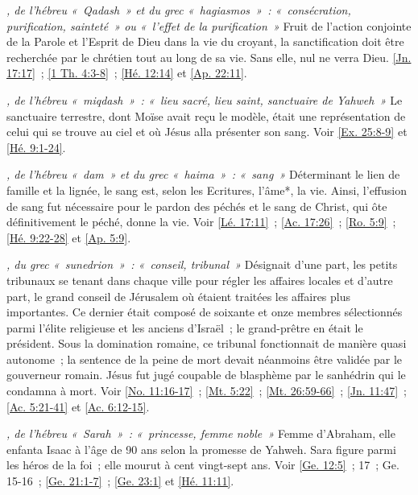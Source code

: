 \begin{multicols}{2}
\textit{, de l'hébreu «~Qadash~» et du grec «~hagiasmos~»~: «~consécration, purification, sainteté~» ou «~l'effet de la purification~»}\newline
Fruit de l'action conjointe de la Parole et l'Esprit de Dieu dans la vie du croyant, la sanctification doit être recherchée par le chrétien tout au long de sa vie. Sans elle, nul ne verra Dieu.\newline
\vref{Jn. 17:17}~; \vref{1 Th. 4:3-8}~; \vref{Hé. 12:14} et \vref{Ap. 22:11}.

\textit{, de l'hébreu «~miqdash~»~: «~lieu sacré, lieu saint, sanctuaire de Yahweh~»}\newline
Le sanctuaire terrestre, dont Moïse avait reçu le modèle, était une représentation de celui qui se trouve au ciel et où Jésus alla présenter son sang.\newline
Voir \vref{Ex. 25:8-9} et \vref{Hé. 9:1-24}.

\textit{, de l'hébreu «~dam~» et du grec «~haima~»~: «~sang~»}\newline
Déterminant le lien de famille et la lignée, le sang est, selon les Ecritures, l'âme*, la vie. Ainsi, l'effusion de sang fut nécessaire pour le pardon des péchés et le sang de Christ, qui ôte définitivement le péché, donne la vie.\newline
Voir \vref{Lé. 17:11}~; \vref{Ac. 17:26}~; \vref{Ro. 5:9}~; \vref{Hé. 9:22-28} et \vref{Ap. 5:9}.

\textit{, du grec «~sunedrion~»~: «~conseil, tribunal~»}\newline
Désignait d'une part, les petits tribunaux se tenant dans chaque ville pour régler les affaires locales et d'autre part, le grand conseil de Jérusalem où étaient traitées les affaires plus importantes. Ce dernier était composé de soixante et onze membres sélectionnés parmi l'élite religieuse et les anciens d'Israël~; le grand-prêtre en était le président. Sous la domination romaine, ce tribunal fonctionnait de manière quasi autonome~; la sentence de la peine de mort devait néanmoins être validée par le gouverneur romain. Jésus fut jugé coupable de blasphème par le sanhédrin qui le condamna à mort.\newline
Voir \vref{No. 11:16-17}~; \vref{Mt. 5:22}~; \vref{Mt. 26:59-66}~; \vref{Jn. 11:47}~; \vref{Ac. 5:21-41} et \vref{Ac. 6:12-15}.

\textit{, de l'hébreu «~Sarah~»~: «~princesse, femme noble~»}\newline
Femme d'Abraham, elle enfanta Isaac à l'âge de 90 ans selon la promesse de Yahweh. Sara figure parmi les héros de la foi~; elle mourut à cent vingt-sept ans.\newline
Voir \vref{Ge. 12:5}~; 17~; Ge. 15-16~; \vref{Ge. 21:1-7}~; \vref{Ge. 23:1} et \vref{Hé. 11:11}.


\end{multicols}
